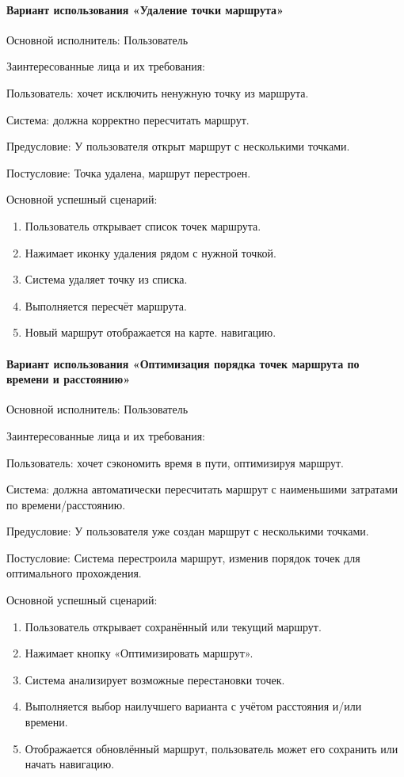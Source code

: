 \paragraph{Вариант использования «Удаление точки маршрута»}

Основной исполнитель: Пользователь

Заинтересованные лица и их требования:

Пользователь: хочет исключить ненужную точку из маршрута.

Система: должна корректно пересчитать маршрут.

Предусловие: У пользователя открыт маршрут с несколькими точками.

Постусловие: Точка удалена, маршрут перестроен.

Основной успешный сценарий:
\begin{enumerate}
	\item Пользователь открывает список точек маршрута.
	\item Нажимает иконку удаления рядом с нужной точкой.
	\item Система удаляет точку из списка.
	\item Выполняется пересчёт маршрута.
	\item Новый маршрут отображается на карте. навигацию.
\end{enumerate}

\paragraph{Вариант использования «Оптимизация порядка точек маршрута по времени и расстоянию»}

Основной исполнитель: Пользователь

Заинтересованные лица и их требования:

Пользователь: хочет сэкономить время в пути, оптимизируя маршрут.

Система: должна автоматически пересчитать маршрут с наименьшими затратами по времени/расстоянию.

Предусловие: У пользователя уже создан маршрут с несколькими точками.

Постусловие: Система перестроила маршрут, изменив порядок точек для оптимального прохождения.

Основной успешный сценарий:
\begin{enumerate}
	\item Пользователь открывает сохранённый или текущий маршрут.
	\item Нажимает кнопку «Оптимизировать маршрут».
	\item Система анализирует возможные перестановки точек.
	\item Выполняется выбор наилучшего варианта с учётом расстояния и/или времени.
	\item Отображается обновлённый маршрут, пользователь может его сохранить или начать навигацию.
\end{enumerate}

